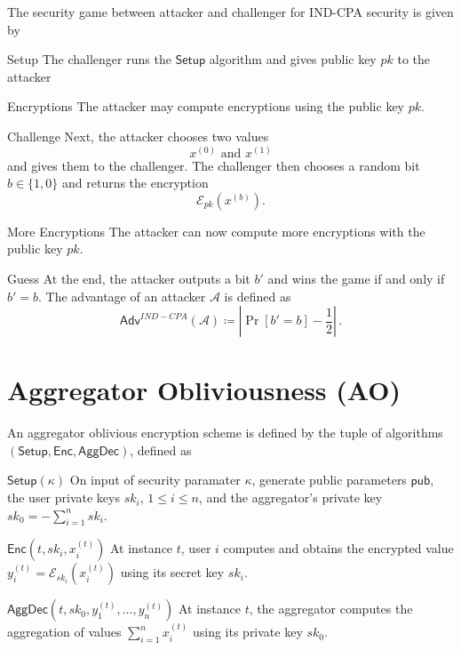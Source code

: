 \documentclass[10pt,journal,compsoc]{IEEEtran}
\theoremstyle{definition}
\theoremstyle{definition}
\theoremstyle{remark}
\begin{document}
The security game between attacker and challenger for IND-CPA security is given by
\begin{LaTeXdescription}
    \item[Setup] The challenger runs the $\mathsf{Setup}$ algorithm and gives public key $pk$ to the attacker
    \item[Encryptions] The attacker may compute encryptions using the public key $pk$.
    \item[Challenge] Next, the attacker chooses two values
    \begin{equation*}
        x^{(0)} \text{ and } x^{(1)}
    \end{equation*}
    and gives them to the challenger. The challenger then chooses a random bit $b \in \{1,0\}$ and returns the encryption
    \begin{equation*}
        \mathcal{E}_{pk}(x^{(b)}).
    \end{equation*}
    \item[More Encryptions] The attacker can now compute more encryptions with the public key $pk$.
    \item[Guess] At the end, the attacker outputs a bit $b'$ and wins the game if and only if $b' = b$. The advantage of an attacker $\mathcal{A}$ is defined as
    \begin{equation*}
        \mathsf{Adv}^{IND-CPA}(\mathcal{A}) \coloneqq \left\lvert \Pr [b'=b] - \frac{1}{2}\right\rvert\,.
    \end{equation*} 
\end{LaTeXdescription}

\section{Aggregator Obliviousness (AO)} \label{app:ao}
An aggregator oblivious encryption scheme is defined by the tuple of algorithms $(\mathsf{Setup}, \mathsf{Enc}, \mathsf{AggDec})$, defined as
\begin{LaTeXdescription}
    \item[$\mathsf{Setup}(\kappa)$] On input of security paramater $\kappa$, generate public parameters $\mathsf{pub}$, the user private keys $sk_i,\,1\leq i \leq n$, and the aggregator's private key $sk_0=-\sum^n_{i=1}sk_i$.
    \item[$\mathsf{Enc}(t, sk_i, x^{(t)}_i)$] At instance $t$, user $i$ computes and obtains the encrypted value $y^{(t)}_i = \mathcal{E}_{sk_i}(x^{(t)}_i)$ using its secret key $sk_i$.
    \item[$\mathsf{AggDec}(t, sk_0, y^{(t)}_1,\dots,y^{(t)}_n)$] At instance $t$, the aggregator computes the aggregation of values $\sum^{n}_{i=1} x^{(t)}_i$ using its private key $sk_0$.
\end{LaTeXdescription}
\end{document}

